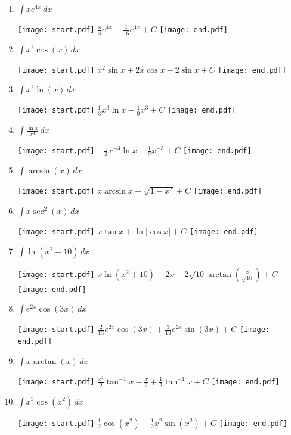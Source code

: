\documentclass[12pt]{article}
\begin{document}
\begin{enumerate}

\item $\int xe^{4x}\,dx$ 

\texttt{[image: start.pdf]}
{{$\frac{x}{4}e^{4x}-\frac{1}{16}e^{4x}+C$}}
\texttt{[image: end.pdf]}


\item $\int x^2\cos{(x)}\,dx$ 

\texttt{[image: start.pdf]}
{{$x^2\sin{x}+2x\cos{x}-2\sin{x}+C$}}
\texttt{[image: end.pdf]}


\item $\int x^2\ln{(x)}\,dx$ 

\texttt{[image: start.pdf]}
{{$\frac{1}{3}x^3\ln{x}-\frac{1}{9}x^3+C$}}
\texttt{[image: end.pdf]}


\item $\int{\frac{\ln{x}}{x^4}} \,dx$

\texttt{[image: start.pdf]}
{{$-\frac{1}{3}x^{-3}\ln{x}-\frac{1}{9}x^{-3}+C$}}
\texttt{[image: end.pdf]}


\item $\int \arcsin{(x)}\,dx$ 

\texttt{[image: start.pdf]}
{{$x\arcsin{x}+\sqrt{1-x^2}+C$}}
\texttt{[image: end.pdf]}


\item $\int x\sec^2{(x)}\,dx$ 

\texttt{[image: start.pdf]}
{{$x\tan{x}+\ln{|\cos{x}|}+C$}}
\texttt{[image: end.pdf]}


\item $\int \ln{(x^2+10)}\,dx$ 

\texttt{[image: start.pdf]}
{{$x\ln{(x^2+10)}-2x+2\sqrt{10}\arctan{\left(\frac{x}{\sqrt{10}}\right)}+C$}}
\texttt{[image: end.pdf]}


\item $\int e^{2x}\cos{(3x)}\,dx$ 

\texttt{[image: start.pdf]}
{{$\frac{2}{13}e^{2x}\cos{(3x)}+\frac{3}{13}e^{2x}\sin{(3x)}+C$}}
\texttt{[image: end.pdf]}


\item $\int x\arctan{(x)}\,dx$

\texttt{[image: start.pdf]}
{{$\frac{x^2}{2}\tan^{-1}x-\frac{x}{2}+\frac{1}{2}\tan^{-1}x+C$}}
\texttt{[image: end.pdf]}


\item $\int x^3 \cos{(x^2)} \,dx$

\texttt{[image: start.pdf]}
{{$\frac{1}{2}\cos{(x^2)}+\frac{1}{2}x^2\sin{(x^2)}+C$}}
\texttt{[image: end.pdf]}



\end{enumerate}
\end{document}
